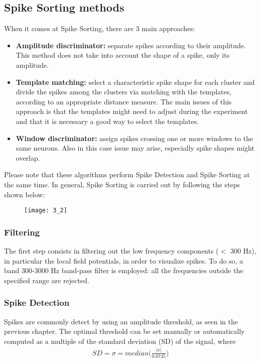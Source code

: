 \subsection{Spike Sorting methods}
When it comes at Spike Sorting, there are 3 main approaches:
\begin{itemize}
    \item \textbf{Amplitude discriminator:} separate spikes according to their amplitude.
          This method does not take into account the shape of a spike, only its
          amplitude.
    \item \textbf{Template matching:} select a characteristic spike shape for each cluster
          and divide the spikes among the clusters via matching with the templates,
          according to an appropriate distance measure. The main issues of this
          approach is that the templates might need to adjust during the experiment
          and that it is necessary a good way to select the templates.
    \item \textbf{Window discriminator:} assign spikes crossing one or more windows
          to the same neurons. Also in this case issue may arise, especially spike
          shapes might overlap.
\end{itemize}
Please note that these algorithms perform Spike Detection and Spike Sorting at the same time.
In general, Spike Sorting is carried out by following the steps shown below:
\begin{figure}[H]
    \texttt{[image: 3\_2]}
    \centering
\end{figure}
\subsubsection{Filtering}
The first step consists in filtering out the low frequency components
(\(<\) 300 Hz), in particular the local field potentials, in order to visualize
spikes.
To do so, a band 300-3000 Hz band-pass filter is employed: all the
frequencies outside the specified range are rejected.
\subsubsection{Spike Detection}
Spikes are commonly detect by using an amplitude threshold, as seen in the
previous chapter. The optimal threshold can be set manually or automatically
computed as a multiple of the standard deviation (SD) of the signal, where
\begin{align*}
    SD=\sigma=median\biggl(\frac{|x|}{0.6745}\biggr)
\end{align*}
